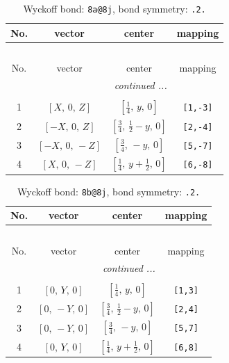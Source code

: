 \documentclass[fleqn,8pt]{jsarticle}
\begin{document}
\begin{longtable}{cccc}
\caption{Wyckoff bond: {\tt 8a@8j}, bond symmetry: {\tt .2.}}
 \\
 \hline \hline
No. & vector & center & mapping \\ \hline \endfirsthead

\multicolumn{3}{l}{\tablename\ \thetable{}} \\
 \hline \hline
No. & vector & center & mapping \\ \hline \endhead

 \hline \hline
\multicolumn{3}{r}{\footnotesize\it continued ...} \\ \endfoot

 \hline \hline
\multicolumn{3}{r}{} \\ \endlastfoot

1 & $\left[ X,\, 0,\, Z \right]$ & $\left[ \frac{1}{4},\, y,\, 0 \right]$ & {\tt [1,-3]} \\ \hline
2 & $\left[ - X,\, 0,\, Z \right]$ & $\left[ \frac{3}{4},\, \frac{1}{2} - y,\, 0 \right]$ & {\tt [2,-4]} \\ \hline
3 & $\left[ - X,\, 0,\, - Z \right]$ & $\left[ \frac{3}{4},\, - y,\, 0 \right]$ & {\tt [5,-7]} \\ \hline
4 & $\left[ X,\, 0,\, - Z \right]$ & $\left[ \frac{1}{4},\, y + \frac{1}{2},\, 0 \right]$ & {\tt [6,-8]} \\
\end{longtable}
\renewcommand{\arraystretch}{1.2}
\begin{longtable}{cccc}
\caption{Wyckoff bond: {\tt 8b@8j}, bond symmetry: {\tt .2.}}
 \\
 \hline \hline
No. & vector & center & mapping \\ \hline \endfirsthead

\multicolumn{3}{l}{\tablename\ \thetable{}} \\
 \hline \hline
No. & vector & center & mapping \\ \hline \endhead

 \hline \hline
\multicolumn{3}{r}{\footnotesize\it continued ...} \\ \endfoot

 \hline \hline
\multicolumn{3}{r}{} \\ \endlastfoot

1 & $\left[ 0,\, Y,\, 0 \right]$ & $\left[ \frac{1}{4},\, y,\, 0 \right]$ & {\tt [1,3]} \\ \hline
2 & $\left[ 0,\, - Y,\, 0 \right]$ & $\left[ \frac{3}{4},\, \frac{1}{2} - y,\, 0 \right]$ & {\tt [2,4]} \\ \hline
3 & $\left[ 0,\, - Y,\, 0 \right]$ & $\left[ \frac{3}{4},\, - y,\, 0 \right]$ & {\tt [5,7]} \\ \hline
4 & $\left[ 0,\, Y,\, 0 \right]$ & $\left[ \frac{1}{4},\, y + \frac{1}{2},\, 0 \right]$ & {\tt [6,8]} \\
\end{longtable}
\end{document}
